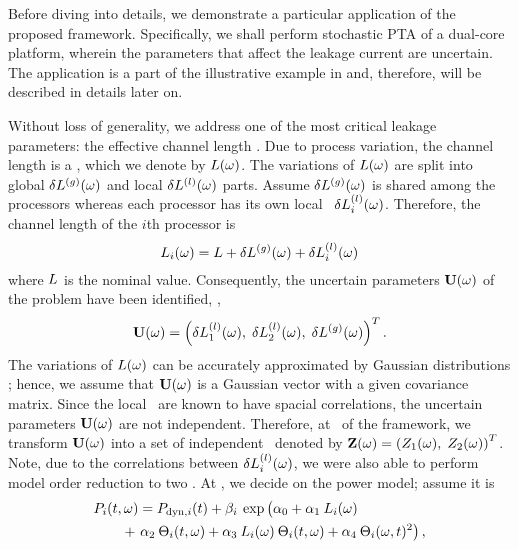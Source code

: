 Before diving into details, we demonstrate a particular application of the proposed framework. Specifically, we shall perform stochastic PTA of a dual-core platform, wherein the parameters that affect the leakage current are uncertain. The application is a part of the illustrative example in  and, therefore, will be described in details later on.


Without loss of generality, we address one of the most critical leakage parameters: the effective channel length \cite{chandra2010, juan2011, juan2012, srivastava2010, shen2009}. Due to process variation, the channel length is a \rv, which we denote by $L(\omega)$. The variations of $L(\omega)$ are split into global ${\delta L^{(g)}}(\omega)$ and local $\delta L^{(l)}(\omega)$ parts. Assume ${\delta L^{(g)}}(\omega)$ is shared among the processors whereas each processor has its own local \rv\ $\delta L^{(l)}_i(\omega)$. Therefore, the channel length of the $i$th processor is
\begin{equation} \elabel{leakage-partition}
  \Leff_i(\o) = \nLeff + \gLeff(\o) + \lLeff_i(\o)
\end{equation}
where $L$ is the nominal value. Consequently, the uncertain parameters $\mathbf{U}(\omega)$ of the problem have been identified, \ie,
\[
  \mathbf{U}(\omega) = \left(\delta L^{(l)}_1(\omega), \; \delta L^{(l)}_2(\omega), \; {\delta L^{(g)}}(\omega) \right)^T.
\]
The variations of $L(\omega)$ can be accurately approximated by Gaussian distributions \cite{juan2011, juan2012, srivastava2010}; hence, we assume that $\mathbf{U}(\omega)$ is a Gaussian vector with a given covariance matrix. Since the local \rvs\ are known to have spacial correlations, the uncertain parameters $\mathbf{U}(\omega)$ are not independent. Therefore, at \ of the framework, we transform $\mathbf{U}(\omega)$ into a set of independent \rvs\ denoted by $\mathbf{Z}(\omega) = \left(Z_1(\omega), \; Z_2(\omega)\right)^T$. Note, due to the correlations between $\delta L^{(l)}_i(\omega)$, we were also able to perform model order reduction to two \rvs. At , we decide on the power model; assume it is
\begin{align*}
  & \P_i(\t, \o) = \P_{\dyn, i}(\t) + \beta_i \: \exp \left(\vphantom{\T^2_i} \alpha_0 + \alpha_1 \: \Leff_i(\o) \right. \\
  & \qquad {} + \left. \alpha_2 \: \T_i(\t, \o) + \alpha_3 \: \Leff_i(\o) \: \T_i(\t, \o) + \alpha_4 \: \T_i(\o, \t)^2 \right),
\end{align*}
